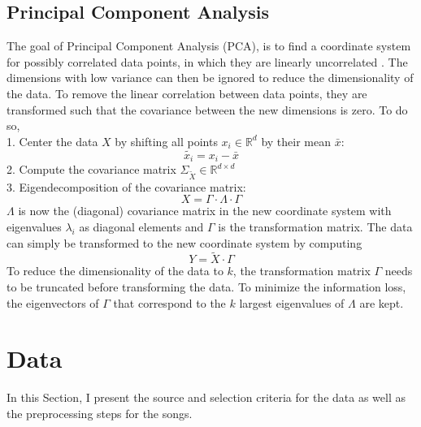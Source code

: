 \documentclass[conference]{IEEEtran}
\begin{document}
\subsection{Principal Component Analysis}
The goal of Principal Component Analysis (PCA), is to find a coordinate system for possibly correlated data points, in which they are linearly uncorrelated \cite{pca_leskovec, pca_jolliffe}. The dimensions with low variance can then be ignored to reduce the dimensionality of the data. To remove the linear correlation between data points, they are transformed such that the covariance between the new dimensions is zero. To do so,\\
1. Center the data $X$ by shifting all points $x_i \in \mathbb{R}^d$ by their mean $\bar{x}$: $${\widetilde{x_i} = x_i - \bar{x}}$$
2. Compute the covariance matrix $\Sigma_{\widetilde{X}} \in \mathbb{R}^{d{\times}d}$\\
3. Eigendecomposition of the covariance matrix: $$X = \Gamma \cdot \Lambda \cdot \Gamma$$
$\Lambda$ is now the (diagonal) covariance matrix in the new coordinate system with eigenvalues $\lambda_i$ as diagonal elements and $\Gamma$ is the transformation matrix. The data can simply be transformed to the new coordinate system by computing $${Y = \widetilde{X} \cdot \Gamma}$$
To reduce the dimensionality of the data to $k$, the transformation matrix $\Gamma$ needs to be truncated before transforming the data. To minimize the information loss, the eigenvectors of $\Gamma$ that correspond to the $k$ largest eigenvalues of $\Lambda$ are kept.

\section{Data}
In this Section, I present the source and selection criteria for the data as well as the preprocessing steps for the songs.
\end{document}
